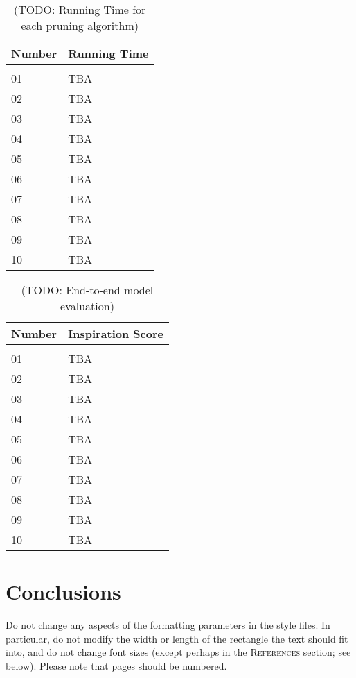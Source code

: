 \documentclass{article} %
\begin{document}
\begin{table}[t]
\caption{(TODO: Running Time for each pruning algorithm)}
\label{table-7}
\begin{center}
\begin{tabular}{ll}
\multicolumn{1}{c}{\bf Number}  &\multicolumn{1}{c}{\bf Running Time}
\\ \hline \\
01         &TBA \\
02         &TBA \\
03         &TBA \\
04         &TBA \\
05         &TBA \\
06         &TBA \\
07         &TBA \\
08         &TBA \\
09         &TBA \\
10         &TBA \\
\end{tabular}
\end{center}
\end{table}

\begin{table}[t]
\caption{(TODO: End-to-end model evaluation)}
\label{table-8}
\begin{center}
\begin{tabular}{ll}
\multicolumn{1}{c}{\bf Number}  &\multicolumn{1}{c}{\bf Inspiration Score}
\\ \hline \\
01         &TBA \\
02         &TBA \\
03         &TBA \\
04         &TBA \\
05         &TBA \\
06         &TBA \\
07         &TBA \\
08         &TBA \\
09         &TBA \\
10         &TBA \\
\end{tabular}
\end{center}
\end{table}

\section{Conclusions}
\label{conclue}
Do not change any aspects of the formatting parameters in the style files.
In particular, do not modify the width or length of the rectangle the text
should fit into, and do not change font sizes (except perhaps in the
\textsc{References} section; see below). Please note that pages should be
numbered.
\end{document}
